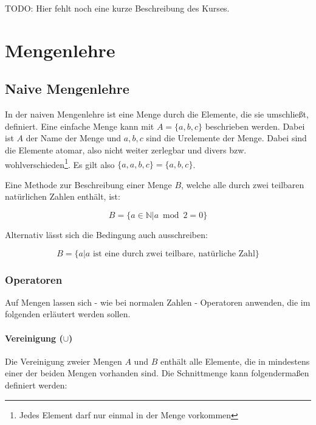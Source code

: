 \documentclass[../main.tex]{subfiles}
\begin{document}
    TODO: Hier fehlt noch eine kurze Beschreibung des Kurses.
    \clearpage

    \section{Mengenlehre}
        \subsection{Naive Mengenlehre}
            In der naiven Mengenlehre ist eine Menge durch die Elemente, die sie umschließt, definiert.
            Eine einfache Menge kann mit $A = \{a, b, c\}$ beschrieben werden. Dabei ist $A$ der Name der Menge und $a, b, c$ sind die Urelemente der Menge. Dabei sind die Elemente atomar, also nicht weiter zerlegbar und divers bzw. wohlverschieden\footnote{Jedes Element darf nur einmal in der Menge vorkommen}. Es gilt also $\{a, a, b, c\} = \{a, b, c\}$.
            
            Eine Methode zur Beschreibung einer Menge $B$, welche alle durch zwei teilbaren natürlichen Zahlen enthält, ist:
            
            \begin{equation}
                B = \{a \in \mathbb{N} | a \bmod 2 = 0\}
            \end{equation}
            
            Alternativ lässt sich die Bedingung auch ausschreiben:
            
            \begin{equation}
                B = \{a | a \text{ ist eine durch zwei teilbare, natürliche Zahl}\}
            \end{equation}
            
            \subsubsection{Operatoren}
                Auf Mengen lassen sich - wie bei normalen Zahlen - Operatoren anwenden, die im folgenden erläutert werden sollen.
                
                \paragraph{Vereinigung ($\cup$)}
                    Die Vereinigung zweier Mengen $A$ und $B$ enthält alle Elemente, die in mindestens einer der beiden Mengen vorhanden sind. Die Schnittmenge kann folgendermaßen definiert werden:
                    
\end{document}

